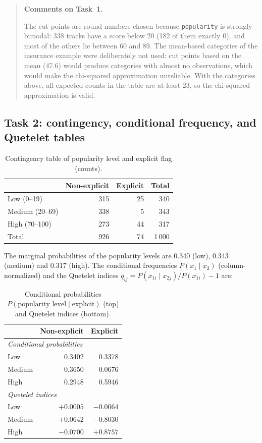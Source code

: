 \documentclass[11pt,letterpaper]{article}
\newenvironment{taskcomments}[1][Comments]{%
  \par\medskip\noindent
  \begin{quote}\small\textbf{#1.}\enspace\ignorespaces
}{%
  \end{quote}\medskip
}
\begin{document}
\begin{taskcomments}[Comments on Task~1]
The cut points are round numbers chosen because \texttt{popularity} is
strongly bimodal: 338 tracks have a score below 20 (182 of them exactly 0),
and most of the others lie between 60 and 89. The mean-based categories of
the insurance example were deliberately not used: cut points based on the
mean (47.6) would produce categories with almost no observations, which
would make the chi-squared approximation unreliable. With the categories
above, all expected counts in the table are at least 23, so the chi-squared
approximation is valid.
\end{taskcomments}

\subsection{Task 2: contingency, conditional frequency, and Quetelet tables}\label{sec:a4t2}

\begin{table}[H]
\centering
\caption{Contingency table of popularity level and explicit flag (counts).}
\label{tab:a4cont}
\small
\begin{tabular}{lrrr}
\toprule
 & Non-explicit & Explicit & Total \\
\midrule
Low (0--19)    & 315 & 25 & 340 \\
Medium (20--69)& 338 & 5  & 343 \\
High (70--100) & 273 & 44 & 317 \\
\midrule
Total          & 926 & 74 & 1\,000 \\
\bottomrule
\end{tabular}
\end{table}

The marginal probabilities of the popularity levels are 0.340 (low), 0.343
(medium) and 0.317 (high). The conditional frequencies $P(x_1 \mid x_2)$
(column-normalized) and the Quetelet indices $q_{ij} = P(x_{1i}\mid
x_{2j})/P(x_{1i}) - 1$ are:

\begin{table}[H]
\centering
\caption{Conditional probabilities $P(\text{popularity level}\mid
\text{explicit})$ (top) and Quetelet indices (bottom).}
\label{tab:a4quetelet}
\small
\begin{tabular}{lrr}
\toprule
 & Non-explicit & Explicit \\
\midrule
\multicolumn{3}{l}{\textit{Conditional probabilities}} \\
Low    & 0.3402 & 0.3378 \\
Medium & 0.3650 & 0.0676 \\
High   & 0.2948 & 0.5946 \\
\midrule
\multicolumn{3}{l}{\textit{Quetelet indices}} \\
Low    & $+0.0005$ & $-0.0064$ \\
Medium & $+0.0642$ & $\mathbf{-0.8030}$ \\
High   & $-0.0700$ & $\mathbf{+0.8757}$ \\
\bottomrule
\end{tabular}
\end{table}
\end{document}
